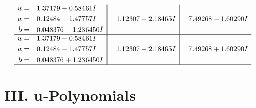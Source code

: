 \documentclass[1p]{elsarticle_modified}
\theoremstyle{definition}
\begin{document}
$$\begin{array}{c|c|c}
\begin{aligned}
u &= \phantom{-}1.37179 + 0.58461 I \\
a &= \phantom{-}0.12484 + 1.47757 I \\
b &= \phantom{-}0.048376 - 1.236450 I\end{aligned}
 & \phantom{-}1.12307 + 2.18465 I & \phantom{-}7.49268 - 1.60290 I \\ \hline\begin{aligned}
u &= \phantom{-}1.37179 - 0.58461 I \\
a &= \phantom{-}0.12484 - 1.47757 I \\
b &= \phantom{-}0.048376 + 1.236450 I\end{aligned}
 & \phantom{-}1.12307 - 2.18465 I & \phantom{-}7.49268 + 1.60290 I\\
 \hline 
 \end{array}$$\newpage
\newpage\renewcommand{\arraystretch}{1}
\centering \section*{ III. u-Polynomials}
\end{document}
